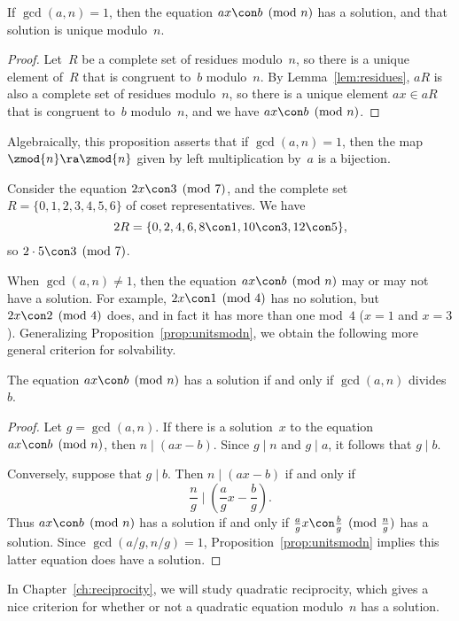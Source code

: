 \begin{proposition}[Units]\label{prop:unitsmodn}
If $\gcd(a,n)=1$, then the equation
$
 ax\con b\pmod{n}
$
has a solution, and that solution is unique modulo~$n$.
\end{proposition}
\begin{proof}
Let~$R$ be a complete set of residues modulo~$n$, so there
is a unique element of~$R$ that is congruent to~$b$ modulo~$n$.
By Lemma~\ref{lem:residues},
$aR$ is also a complete set of residues modulo~$n$, so
there is a unique element $ax\in aR$ that is congruent
to~$b$ modulo~$n$, and we have $ax\con b\pmod{n}$.
\end{proof}
Algebraically, this proposition asserts that if $\gcd(a,n)=1$, then
the map $\zmod{n}\ra \zmod{n}$ given by left multiplication by~$a$ is
a bijection.

\begin{example}
Consider the equation $2x\con 3\pmod{7}$,
and the complete set $R = \{0,1,2,3,4,5,6\}$
of coset representatives.  We have
$$
  2R = \{0,2,4,6,8\con 1, 10\con 3, 12\con 5\},
$$
so $2\cdot 5\con 3\pmod{7}$.
\end{example}

When $\gcd(a,n)\neq 1$, then the equation $ax\con b\pmod{n}$ may or
may not have a solution.  For example, $2x\con 1\pmod{4}$ has no
solution, but $2x\con 2\pmod{4}$ does, and in fact it has more than
one mod~$4$ ($x=1$ and $x=3$).  Generalizing
Proposition~\ref{prop:unitsmodn}, we obtain the following more general
criterion for solvability.
\begin{proposition}[Solvability]\label{prop:cancel2}
The equation $ax\con b\pmod{n}$ has a solution
if and only if $\gcd(a,n)$ divides~$b$.
\end{proposition}
\begin{proof}
  Let $g=\gcd(a,n)$.  If there is a solution~$x$ to the equation
  $ax\con b\pmod{n}$, then $n\mid (ax-b)$.  Since $g\mid n$ and $g\mid
  a$, it follows that $g\mid b$.

  Conversely, suppose that $g\mid b$.  Then $n\mid (ax-b)$ if and only
  if $$
  \frac{n}{g} \mid \left(\frac{a}{g} x - \frac{b}{g}\right).  $$
  Thus $ax\con b\pmod{n}$ has a solution if and only if $\frac{a}{g}x
  \con \frac{b}{g}\pmod{\frac{n}{g}}$ has a solution.  Since
  $\gcd(a/g, n/g)=1$, Proposition~\ref{prop:unitsmodn} implies this
  latter equation does have a solution.
\end{proof}

In Chapter~\ref{ch:reciprocity}, we will study quadratic reciprocity,
which gives a nice criterion for whether or not a quadratic equation
modulo~$n$ has a solution.

